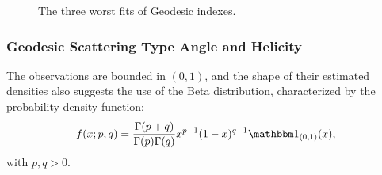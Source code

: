 \documentclass[journal]{IEEEtran}
\begin{document}
\begin{figure}[hbt]
	\centering
{}
%
%
	\caption{The three worst fits of Geodesic indexes.}
\end{figure}

\subsubsection{Geodesic Scattering Type Angle and Helicity}

The observations are bounded in $(0,1)$, 
and the shape of their estimated densities also suggests the use of the Beta distribution, characterized by the probability density function:
\begin{equation}
f(x; p, q) = \frac{\Gamma(p+q)}{\Gamma(p)\Gamma(q)} x^{p-1} (1-x)^{q-1} \mathbbm 1_{(0,1)}(x),
\label{eq:BetaDensity}
\end{equation}
with $p,q>0$.
\end{document}
